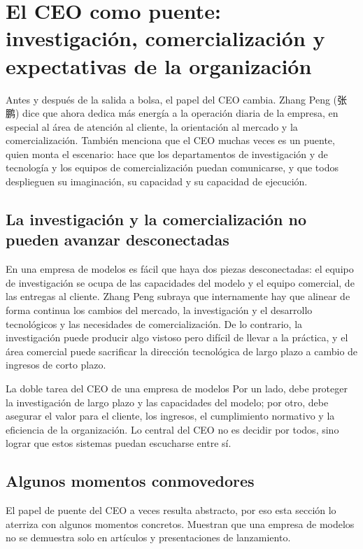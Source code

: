 \section{El CEO como puente: investigación, comercialización y expectativas de la organización}

Antes y después de la salida a bolsa, el papel del CEO cambia. Zhang Peng (张鹏) dice que ahora dedica más energía a la operación diaria de la empresa, en especial al área de atención al cliente, la orientación al mercado y la comercialización. También menciona que el CEO muchas veces es un puente, quien monta el escenario: hace que los departamentos de investigación y de tecnología y los equipos de comercialización puedan comunicarse, y que todos desplieguen su imaginación, su capacidad y su capacidad de ejecución.

\subsection{La investigación y la comercialización no pueden avanzar desconectadas}

En una empresa de modelos es fácil que haya dos piezas desconectadas: el equipo de investigación se ocupa de las capacidades del modelo y el equipo comercial, de las entregas al cliente. Zhang Peng subraya que internamente hay que alinear de forma continua los cambios del mercado, la investigación y el desarrollo tecnológicos y las necesidades de comercialización. De lo contrario, la investigación puede producir algo vistoso pero difícil de llevar a la práctica, y el área comercial puede sacrificar la dirección tecnológica de largo plazo a cambio de ingresos de corto plazo.

\begin{importantbox}{La doble tarea del CEO de una empresa de modelos}
Por un lado, debe proteger la investigación de largo plazo y las capacidades del modelo; por otro, debe asegurar el valor para el cliente, los ingresos, el cumplimiento normativo y la eficiencia de la organización. Lo central del CEO no es decidir por todos, sino lograr que estos sistemas puedan escucharse entre sí.
\end{importantbox}

\subsection{Algunos momentos conmovedores}

El papel de puente del CEO a veces resulta abstracto, por eso esta sección lo aterriza con algunos momentos concretos. Muestran que una empresa de modelos no se demuestra solo en artículos y presentaciones de lanzamiento.

